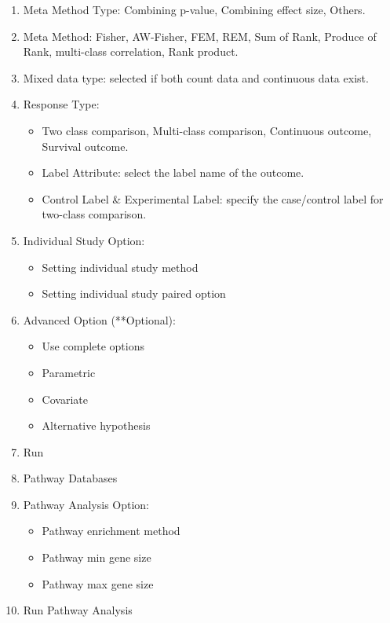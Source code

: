 \begin{enumerate}
  \item Meta Method Type: Combining p-value, Combining effect size, Others.
  \item Meta Method: Fisher, AW-Fisher, FEM, REM, Sum of Rank, Produce of Rank, multi-class correlation, Rank product. 
  \item Mixed data type: selected if both count data and continuous data exist.
  \item Response Type:
   \begin{itemize}
     \item Two class comparison, Multi-class comparison, Continuous outcome, Survival outcome.
     \item Label Attribute: select the label name of the outcome.
     \item Control Label \& Experimental Label: specify the case/control label for two-class comparison.
    \end{itemize}
   \item Individual Study Option:
     \begin{itemize}
     \item Setting individual study method
     \item Setting individual study paired option
    \end{itemize} 
   \item Advanced Option (**Optional):
     \begin{itemize}
      \item Use complete options
      \item Parametric
      \item Covariate
      \item Alternative hypothesis
    \end{itemize} 
    \item Run
    \item Pathway Databases
    \item Pathway Analysis Option:
         \begin{itemize}
      \item Pathway enrichment method
      \item Pathway min gene size
      \item Pathway max gene size
    \end{itemize} 
    \item Run Pathway Analysis
\end{enumerate}




